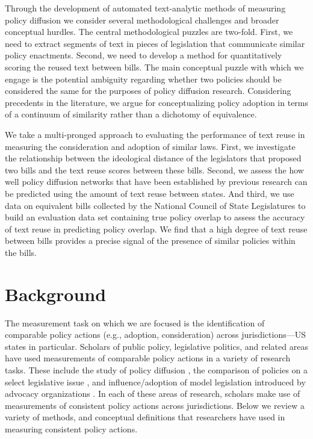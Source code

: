 \documentclass[12pt]{article} %
\begin{document}
Through the development of automated text-analytic methods of measuring policy diffusion we consider several methodological challenges and broader conceptual hurdles. The central methodological puzzles are two-fold. First, we need to extract segments of text in pieces of legislation that communicate similar policy enactments. Second, we need to develop a method for quantitatively scoring the reused text between bills. The main conceptual puzzle with which we engage is the potential ambiguity regarding whether two policies should be considered the same for the purposes of policy diffusion research. Considering precedents in the literature, we argue for conceptualizing policy adoption in terms of a continuum of similarity rather than a dichotomy of equivalence.

We take a multi-pronged approach to evaluating the performance of text reuse in measuring the consideration and adoption of similar laws. First, we investigate the relationship between the ideological distance of the legislators that proposed two bills and the text reuse scores between these bills. Second, we assess the how well policy diffusion networks that have been established by previous research can be predicted using the amount of text reuse between states. And third, we use data on equivalent bills collected by the National Council of State Legislatures to build an evaluation data set containing true policy overlap to assess the accuracy of text reuse in predicting policy overlap. We find that a high degree of text reuse between bills provides a precise signal of the presence of similar policies within the bills. 


\section{Background}

The measurement task on which we are focused is the identification of comparable policy actions (e.g., adoption, consideration) across jurisdictions---US states in particular. Scholars of public policy, legislative politics, and related areas have used measurements of comparable policy actions in a variety of research tasks. These include the study of policy diffusion \citep{karch2007emerging}, the comparison of policies on a select legislative issue \citep[e.g., ][]{huber2001legislatures,mycoff2009empirical}, and influence/adoption of model legislation introduced by advocacy organizations \citep[e.g., ][]{garrett2015,burgess2016legislative}. In each of these areas of research, scholars make use of measurements of consistent policy actions across jurisdictions. Below we review a variety of methods, and conceptual definitions that researchers have used in measuring consistent policy actions.
\end{document}
